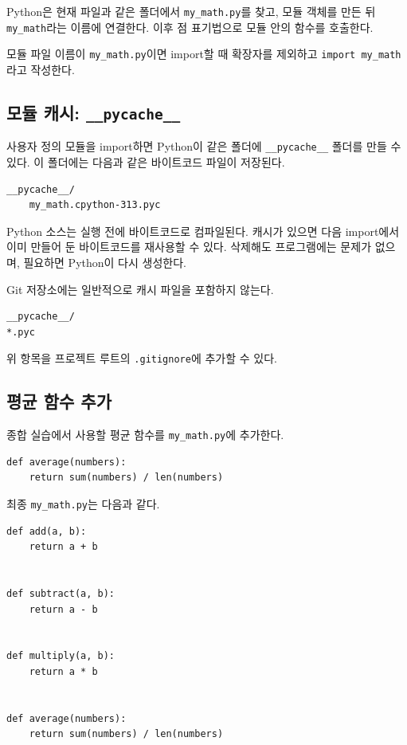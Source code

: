 \documentclass[11pt,a4paper]{article}
\begin{document}
Python은 현재 파일과 같은 폴더에서 \texttt{my\_math.py}를 찾고, 모듈 객체를 만든 뒤 \texttt{my\_math}라는 이름에 연결한다. 이후 점 표기법으로 모듈 안의 함수를 호출한다.

\begin{importantbox}
모듈 파일 이름이 \texttt{my\_math.py}이면 import할 때 확장자를 제외하고 \texttt{import my\_math}라고 작성한다.
\end{importantbox}

\subsection{모듈 캐시: \texttt{\_\_pycache\_\_}}

사용자 정의 모듈을 import하면 Python이 같은 폴더에 \texttt{\_\_pycache\_\_} 폴더를 만들 수 있다. 이 폴더에는 다음과 같은 바이트코드 파일이 저장된다.

\begin{verbatim}
__pycache__/
    my_math.cpython-313.pyc
\end{verbatim}

Python 소스는 실행 전에 바이트코드로 컴파일된다. 캐시가 있으면 다음 import에서 이미 만들어 둔 바이트코드를 재사용할 수 있다. 삭제해도 프로그램에는 문제가 없으며, 필요하면 Python이 다시 생성한다.

Git 저장소에는 일반적으로 캐시 파일을 포함하지 않는다.

\begin{verbatim}
__pycache__/
*.pyc
\end{verbatim}

위 항목을 프로젝트 루트의 \texttt{.gitignore}에 추가할 수 있다.

\subsection{평균 함수 추가}

종합 실습에서 사용할 평균 함수를 \texttt{my\_math.py}에 추가한다.

\begin{lstlisting}
def average(numbers):
    return sum(numbers) / len(numbers)
\end{lstlisting}

최종 \texttt{my\_math.py}는 다음과 같다.

\begin{lstlisting}
def add(a, b):
    return a + b


def subtract(a, b):
    return a - b


def multiply(a, b):
    return a * b


def average(numbers):
    return sum(numbers) / len(numbers)
\end{lstlisting}
\end{document}
